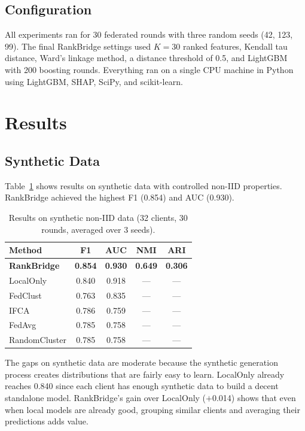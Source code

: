 \documentclass[information,article,submit,pdftex]{mdpi}
\begin{document}
\subsection{Configuration}

All experiments ran for 30 federated rounds with three random seeds (42, 123, 99).
The final RankBridge settings used $K = 30$ ranked features, Kendall tau distance,
Ward's linkage method, a distance threshold of 0.5, and LightGBM with 200
boosting rounds. Everything ran on a single CPU machine in Python using LightGBM,
SHAP, SciPy, and scikit-learn.

\section{Results}\label{sec:results}

\subsection{Synthetic Data}

Table~\ref{tab:synthetic_results} shows results on synthetic data with controlled
non-IID properties. RankBridge achieved the highest F1 (0.854) and AUC (0.930).

\begin{table}[H]
\caption{Results on synthetic non-IID data (32 clients, 30 rounds, averaged over
  3 seeds).}\label{tab:synthetic_results}
\begin{tabular}{lcccc}
\toprule
\textbf{Method} & \textbf{F1} & \textbf{AUC} & \textbf{NMI} & \textbf{ARI} \\
\midrule
\textbf{RankBridge} & \textbf{0.854} & \textbf{0.930} & \textbf{0.649} &
  \textbf{0.306} \\
LocalOnly           & 0.840 & 0.918 & --- & --- \\
FedClust            & 0.763 & 0.835 & --- & --- \\
IFCA                & 0.786 & 0.759 & --- & --- \\
FedAvg              & 0.785 & 0.758 & --- & --- \\
RandomCluster       & 0.785 & 0.758 & --- & --- \\
\bottomrule
\end{tabular}
\end{table}

The gaps on synthetic data are moderate because the synthetic generation process
creates distributions that are fairly easy to learn. LocalOnly already reaches
0.840 since each client has enough synthetic data to build a decent standalone
model. RankBridge's gain over LocalOnly ($+$0.014) shows that even when local
models are already good, grouping similar clients and averaging their predictions
adds value.
\end{document}
